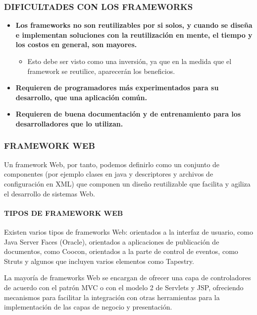 \subsubsection{DIFICULTADES CON LOS FRAMEWORKS}

\begin{itemize}
 \item \textbf{Los frameworks no son reutilizables por si solos, y cuando se diseña e implementan soluciones con la reutilización en mente, el tiempo y los costos en general, son mayores.}
  \begin{itemize}
    \item Esto debe ser visto como una inversión, ya que en la medida que el framework se reutilice, aparecerán los beneficios.
  \end{itemize}
 \item \textbf{Requieren de programadores más experimentados para su desarrollo, que una aplicación común.}
 \item \textbf{Requieren de buena documentación y de entrenamiento para los desarrolladores que lo utilizan.}
\end{itemize}

\subsubsection{FRAMEWORK WEB}
Un framework Web, por tanto, podemos definirlo como un conjunto de
componentes (por ejemplo clases en java y descriptores y archivos de configuración en
XML) que componen un diseño reutilizable que facilita y agiliza el desarrollo de
sistemas Web.\\

\paragraph{TIPOS DE FRAMEWORK WEB} 

Existen varios tipos de frameworks Web: orientados a la interfaz de usuario, como Java Server Faces (Oracle), orientados a aplicaciones de publicación de documentos, como Coocon, orientados a la parte de control de eventos, como Struts y algunos que incluyen varios elementos como Tapestry.

La mayoría de frameworks Web se encargan de ofrecer una capa de controladores de acuerdo con el patrón MVC o con el modelo 2 de Servlets y JSP, ofreciendo mecanismos para facilitar la integración con otras herramientas para la implementación de las capas de negocio y presentación.

